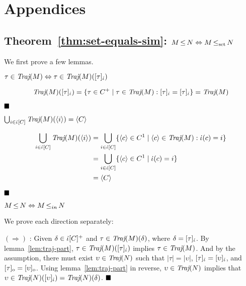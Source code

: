 \section{Appendices}

\subsection{Theorem~\ref{thm:set-equals-sim}: $M \operatorname{\leq} N \Leftrightarrow M \operatorname{\operatorname{\leq}_{\textrm{set}}} N$}

We first prove a few lemmas.

\begin{lemma} \label{lem:traj-part}
$\tau \in \operatorname{\textit{Traj}}(M) \Leftrightarrow \tau \in \operatorname{\textit{Traj}}(M)([\tau]_{\dot{\iota}})$
\end{lemma}

\begin{equation*}
\operatorname{\textit{Traj}}(M)([\tau]_{\dot{\iota}}) = \{ \tau \in C^{+} \mid \tau \in \operatorname{\textit{Traj}}(M) : [\tau]_{\dot{\iota}} = [\tau]_{\dot{\iota}} \} = \operatorname{\textit{Traj}}(M)
\end{equation*}

$\Qed$

\begin{lemma} \label{lem:traj-all}
$\bigcup_{i \in \dot{\iota}[C]} \operatorname{\textit{Traj}}(M)(\langle i \rangle) = \langle C \rangle$
\end{lemma}

\begin{align*}
\bigcup_{i \in \dot{\iota}[C]} \operatorname{\textit{Traj}}(M)(\langle i \rangle) & = \bigcup_{i \in \dot{\iota}[C]} \{ \langle c \rangle \in C^{1} \mid \langle c \rangle \in \operatorname{\textit{Traj}}(M) : \dot{\iota}(c) = i \} \\ & = \bigcup_{i \in \dot{\iota}[C]} \{ \langle c \rangle \in C^{1} \mid \dot{\iota}(c) = i \} \\ & = \langle C \rangle
\end{align*}

$\Qed$

\begin{lemma} \label{lem:ref-iff-in}
$M \operatorname{\leq} N \Leftrightarrow M \operatorname{\leq}_{in} N$
\end{lemma}

We prove each direction separately:

$(\Rightarrow)$ : Given $\delta \in \dot{\iota}[C]^{+}$ and $\tau \in \operatorname{\textit{Traj}}(M)(\delta)$, where $\delta = [\tau]_{\dot{\iota}}$. By lemma~\ref{lem:traj-part}, $\tau \in \operatorname{\textit{Traj}}(M)([\tau]_{\dot{\iota}})$ implies $\tau \in \operatorname{\textit{Traj}}(M)$. And by the assumption, there must exist $\upsilon \in \operatorname{\textit{Traj}}(N)$ such that $| \tau | = | \upsilon |$, $[\tau]_{\dot{\iota}} = [\upsilon]_{\dot{\iota}}$, and $[\tau]_{\mathrm{o}} = [\upsilon]_{\mathrm{o}}$. Using lemma~\ref{lem:traj-part} in reverse, $\upsilon \in \operatorname{\textit{Traj}}(N)$ implies that $\upsilon \in \operatorname{\textit{Traj}}(N)([\upsilon]_{\dot{\iota}}) = \operatorname{\textit{Traj}}(N)(\delta)$. $\Qed$

